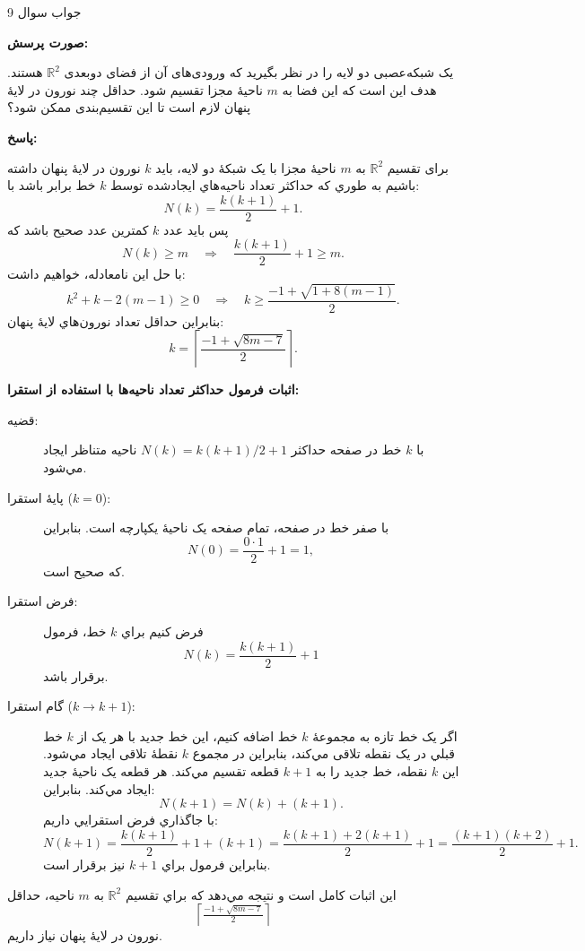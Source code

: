 \documentclass[12pt]{exam}
\begin{document}
	\begin{center}
		\LARGE جواب سوال 9
	\end{center}
	
	\noindent
	\textbf{صورت پرسش:}
	
	یک شبکه‌عصبی دو لایه را در نظر بگیرید که ورودی‌های آن از فضای دوبعدی $\mathbb{R}^2$ هستند. هدف این است که این فضا به $m$ ناحیهٔ مجزا تقسیم شود. حداقل چند نورون در لایهٔ پنهان لازم است تا این تقسیم‌بندی ممکن شود؟
	
	\vspace{1em}
	\noindent
	\textbf{پاسخ:}
	
	برای تقسيم $\mathbb{R}^2$ به $m$ ناحيهٔ مجزا با يک شبکهٔ دو لايه، بايد $k$ نورون در لايهٔ پنهان داشته باشيم به طوري که حداکثر تعداد ناحيه‌هاي ايجادشده توسط $k$ خط برابر باشد با:
	\[
	N(k)=\frac{k(k+1)}{2}+1.
	\]
	پس بايد عدد $k$ کمترين عدد صحيح باشد که
	\[
	N(k)\ge m\quad\Longrightarrow\quad \frac{k(k+1)}{2}+1\ge m.
	\]
	با حل اين نامعادله، خواهيم داشت:
	\[
	k^2 + k -2(m-1)\ge 0
	\quad\Longrightarrow\quad k\ge \frac{-1+\sqrt{1+8(m-1)}}{2}.
	\]
	بنابراين حداقل تعداد نورون‌هاي لايهٔ پنهان:
	\[
	k=\left\lceil\frac{-1+\sqrt{8m-7}}{2}\right\rceil.
	\]
	
	\vspace{1em}
	\noindent
	\textbf{اثبات فرمول حداکثر تعداد ناحیه‌ها با استفاده از استقرا:}
	
	\begin{description}
		\item[قضيه:] با $k$ خط در صفحه حداکثر $N(k)=k(k+1)/2+1$ ناحيه متناظر ايجاد مي‌شود.
		\item[پايهٔ استقرا ($k=0$):] با صفر خط در صفحه، تمام صفحه يک ناحيهٔ يکپارچه است. بنابراين
		\[
		N(0)=\frac{0\cdot1}{2}+1=1,
		\]
		که صحيح است.
		\item[فرض استقرا:] فرض کنيم براي $k$ خط، فرمول
		\[
		N(k)=\frac{k(k+1)}{2}+1
		\]
		برقرار باشد.
		\item[گام استقرا ($k\to k+1$):]
		اگر يک خط تازه به مجموعهٔ $k$ خط اضافه کنيم، اين خط جديد با هر يک از $k$ خط قبلي در يک نقطه تلاقی مي‌کند، بنابراين در مجموع $k$ نقطهٔ تلاقی ايجاد مي‌شود. اين $k$ نقطه، خط جديد را به $k+1$ قطعه تقسيم مي‌کند. هر قطعه يک ناحيهٔ جديد ايجاد مي‌کند. بنابراين:
		\[
		N(k+1)=N(k)+(k+1).
		\]
		با جاگذاري فرض استقرايي داريم:
		\[
		N(k+1)=\frac{k(k+1)}{2}+1+(k+1)
		=\frac{k(k+1)+2(k+1)}{2}+1
		=\frac{(k+1)(k+2)}{2}+1.
		\]
		بنابراين فرمول براي $k+1$ نيز برقرار است.
	\end{description}
	
	\noindent
	اين اثبات کامل است و نتيجه مي‌دهد که براي تقسيم $\mathbb{R}^2$ به $m$ ناحيه، حداقل
	\[
	\left\lceil\tfrac{-1+\sqrt{8m-7}}{2}\right\rceil
	\]
	نورون در لايهٔ پنهان نياز داريم.
	
\end{document}
